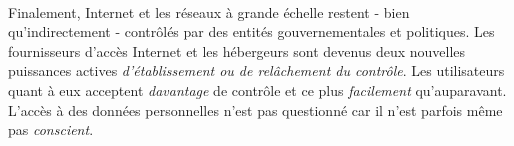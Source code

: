 \paragraph{} Finalement, Internet et les réseaux à grande échelle restent - bien qu'indirectement - contrôlés par des 
entités gouvernementales et politiques. Les fournisseurs d'accès Internet et les hébergeurs sont devenus deux 
nouvelles puissances actives \emph{d'établissement ou de relâchement du contrôle}. Les utilisateurs quant à eux
acceptent \emph{davantage} de contrôle et ce plus \emph{facilement} qu'auparavant. L'accès à des données personnelles
n'est pas questionné car il n'est parfois même pas \emph{conscient}.